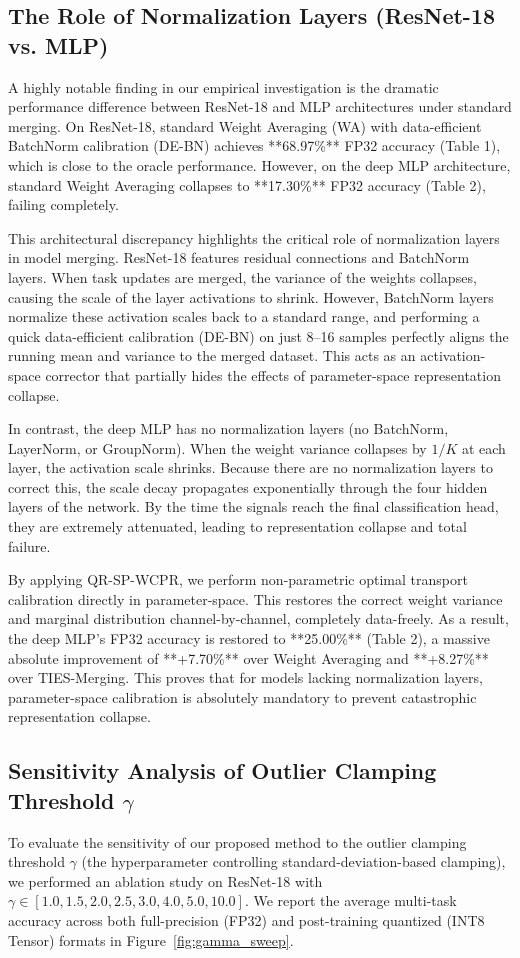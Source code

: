 \documentclass{article}
\theoremstyle{plain}
\theoremstyle{definition}
\theoremstyle{remark}
\begin{document}
\subsection{The Role of Normalization Layers (ResNet-18 vs. MLP)}
A highly notable finding in our empirical investigation is the dramatic performance difference between ResNet-18 and MLP architectures under standard merging. On ResNet-18, standard Weight Averaging (WA) with data-efficient BatchNorm calibration (DE-BN) achieves **68.97\%** FP32 accuracy (Table 1), which is close to the oracle performance. However, on the deep MLP architecture, standard Weight Averaging collapses to **17.30\%** FP32 accuracy (Table 2), failing completely.

This architectural discrepancy highlights the critical role of normalization layers in model merging. ResNet-18 features residual connections and BatchNorm layers. When task updates are merged, the variance of the weights collapses, causing the scale of the layer activations to shrink. However, BatchNorm layers normalize these activation scales back to a standard range, and performing a quick data-efficient calibration (DE-BN) on just 8--16 samples perfectly aligns the running mean and variance to the merged dataset. This acts as an activation-space corrector that partially hides the effects of parameter-space representation collapse.

In contrast, the deep MLP has no normalization layers (no BatchNorm, LayerNorm, or GroupNorm). When the weight variance collapses by $1/K$ at each layer, the activation scale shrinks. Because there are no normalization layers to correct this, the scale decay propagates exponentially through the four hidden layers of the network. By the time the signals reach the final classification head, they are extremely attenuated, leading to representation collapse and total failure. 

By applying QR-SP-WCPR, we perform non-parametric optimal transport calibration directly in parameter-space. This restores the correct weight variance and marginal distribution channel-by-channel, completely data-freely. As a result, the deep MLP's FP32 accuracy is restored to **25.00\%** (Table 2), a massive absolute improvement of **+7.70\%** over Weight Averaging and **+8.27\%** over TIES-Merging. This proves that for models lacking normalization layers, parameter-space calibration is absolutely mandatory to prevent catastrophic representation collapse.

\subsection{Sensitivity Analysis of Outlier Clamping Threshold \(\gamma\)}
To evaluate the sensitivity of our proposed method to the outlier clamping threshold \(\gamma\) (the hyperparameter controlling standard-deviation-based clamping), we performed an ablation study on ResNet-18 with \(\gamma \in [1.0, 1.5, 2.0, 2.5, 3.0, 4.0, 5.0, 10.0]\). We report the average multi-task accuracy across both full-precision (FP32) and post-training quantized (INT8 Tensor) formats in Figure~\ref{fig:gamma_sweep}.
\end{document}
